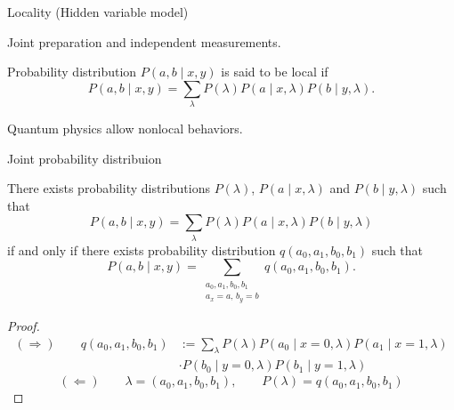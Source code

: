 \documentclass{beamer}
\newcommand\emm[1]{\textcolor{redorange}{{#1}}}
\begin{document}
\begin{frame}{Locality (Hidden variable model)}
\begin{center}
Joint preparation and independent measurements.
\end{center}
Probability distribution $P(a,b\mid x,y)$ is said to be \emm{local} if
\begin{equation*}
P(a, b\mid x,y) = \sum_{\lambda} P(\lambda) P(a\mid x, \lambda) P(b\mid y,\lambda).
\end{equation*}
\vspace{2em}
\begin{center}
Quantum physics allow \emm{nonlocal} behaviors.
\end{center}
\end{frame}

\begin{frame}{Joint probability distribuion}
\small
\begin{lemma}
There exists probability distributions $P(\lambda)$, $P(a\mid x,\lambda)$ and $P(b\mid y,\lambda)$ such that
\begin{equation*}
P(a, b\mid x,y) = \sum_{\lambda} P(\lambda) P(a\mid x, \lambda) P(b\mid y,\lambda)
\end{equation*}
if and only if there exists probability distribution $q(a_0,a_1,b_0,b_1)$ such that
\begin{equation*}
P(a, b\mid x,y) = \sum_{\substack{a_0,a_1,b_0,b_1\\a_x = a,\, b_y = b}} q(a_0, a_1, b_0, b_1).
\end{equation*}
\end{lemma}

\vspace{-2em}
\begin{proof}
\begin{align*}
(\Rightarrow)\qquad
q(a_0,a_1,b_0,b_1) &:= \sum_{\lambda}P(\lambda) P(a_0\mid x=0, \lambda) P(a_1\mid x=1, \lambda)\\
&\cdot P(b_0\mid y=0, \lambda) P(b_1\mid y=1, \lambda)
\end{align*}
\begin{equation*}
(\Leftarrow)\qquad
\lambda = (a_0, a_1, b_0, b_1), \qquad P(\lambda) = q(a_0,a_1,b_0,b_1)
\end{equation*}
\end{proof}
\end{frame}
\end{document}
